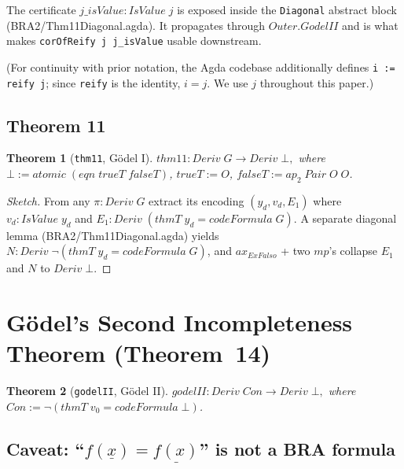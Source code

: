 \documentclass[11pt]{article}
\newtheorem{theorem}{Theorem}
\begin{document}
The certificate $j\_\mathit{isValue} : \mathit{IsValue}\;j$ is
exposed inside the \verb|Diagonal| abstract block
(BRA2/Thm11Diagonal.agda).  It propagates through
$\mathit{Outer.GodelII}$ and is what makes
\verb|corOfReify j j_isValue| usable downstream.

(For continuity with prior notation, the Agda codebase additionally
defines \verb|i := reify j|; since \verb|reify| is the identity,
$i = j$.  We use $j$ throughout this paper.)

\subsection{Theorem 11}

\begin{theorem}[\texttt{thm11}, G\"odel I]
\label{thm:godel-I}
\(
  \mathit{thm11} : \mathit{Deriv}\;G \to \mathit{Deriv}\;\bot,
\)
where $\bot := \mathit{atomic}\;(\mathit{eqn}\;\mathit{trueT}\;\mathit{falseT})$,
$\mathit{trueT} := O$, $\mathit{falseT} := \mathit{ap}_2\;\mathit{Pair}\;O\;O$.
\end{theorem}

\begin{proof}[Sketch]
From any $\pi : \mathit{Deriv}\;G$ extract its encoding
$(y_d, v_d, E_1)$ where $v_d : \mathit{IsValue}\;y_d$ and
$E_1 : \mathit{Deriv}\;(\mathit{thmT}\;y_d = \mathit{codeFormula}\;G)$.
A separate diagonal lemma (BRA2/Thm11Diagonal.agda) yields
$N : \mathit{Deriv}\;\neg(\mathit{thmT}\;y_d = \mathit{codeFormula}\;G)$,
and $\mathit{ax}_{\mathit{ExFalso}}$ + two $\mathit{mp}$'s collapse $E_1$
and $N$ to $\mathit{Deriv}\;\bot$.
\end{proof}

\section{G\"odel's Second Incompleteness Theorem (Theorem~14)}

\begin{theorem}[\texttt{godelII}, G\"odel II]
\label{thm:godel-II}
\(
  \mathit{godelII} : \mathit{Deriv}\;\mathit{Con} \to \mathit{Deriv}\;\bot,
\)
where $\mathit{Con} := \neg(\mathit{thmT}\;v_0 = \mathit{codeFormula}\;\bot)$.
\end{theorem}

\subsection{Caveat: ``$f(\underline{x}) = \underline{f(x)}$'' is not a BRA formula}
\label{subsec:underline-caveat}
\end{document}
